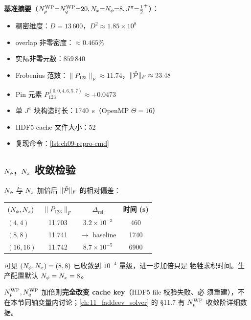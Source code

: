\begin{numericalbox}
\textbf{基准摘要}（\({N_{p}^{\text{WP}}}{=}{N_{q}^{\text{WP}}}{=}20, N_x{=}N_{\phi}{=}8, J^\pi{=}\tfrac{1}{2}^+\)）：
\begin{itemize}
\item 稠密维度：\(D = 13\,600\)，\(D^2 \approx 1.85\!\times\!10^{8}\)
\item overlap 非零密度：\(\approx 0.465\%\)
\item 实际非零元数：\(859\,840\)
\item Frobenius 范数：\(\|P_{123}\|_F \approx 11.74\)，\(\|\hat{\mathcal{P}}\|_F \approx 23.48\)
\item Pin 元素 \(P_{123}^{(0,0,4,6,5,7)} \approx +0.0473\)
\item 单 \(J^\pi\) 块构造时长：\SI{1740}{\second}（OpenMP \(\Theta=16\)）
\item HDF5 cache 文件大小：\SI{52}{\mega\byte}
\item 复现命令：\cref{lst:ch09-repro-cmd}
\end{itemize}
\end{numericalbox}

\subsection{\texorpdfstring{$N_{\phi}$, $N_{x}$}{Nphi, Nx} 收敛检验}
\label{subsec:ch09-convergence-Nphi-Nx}

\(N_{\phi}\) 与 \(N_{x}\) 加倍后 \(\|\hat{\mathcal{P}}\|_F\) 的相对偏差：

\begin{center}
\begin{tabular}{lccc}
\toprule
\((N_{\phi}, N_{x})\) & \(\|P_{123}\|_F\) & \(\Delta_{\text{rel}}\) & 时间 (s) \\
\midrule
\((4, 4)\)   & 11.703 & \(3.2\!\times\!10^{-3}\) & 460 \\
\((8, 8)\)   & 11.741 & \(\to\) baseline         & 1740 \\
\((16, 16)\) & 11.742 & \(8.7\!\times\!10^{-5}\) & 6900 \\
\bottomrule
\end{tabular}
\end{center}

可见 \((N_{\phi}, N_{x})=(8,8)\) 已收敛到 \(10^{-4}\) 量级，进一步加倍只是
牺牲求积时间。生产配置默认 \(N_{\phi}=N_{x}=8\)。

\({N_{p}^{\text{WP}}}, {N_{q}^{\text{WP}}}\) 加倍则\textbf{完全改变 cache key}（HDF5 file 校验失败、必
须重建），不在本节同轴变量内讨论；\cref{ch:11_faddeev_solver} 的 §11.7
有 \({N_{p}^{\text{WP}}}\) 收敛阶详细数据。

